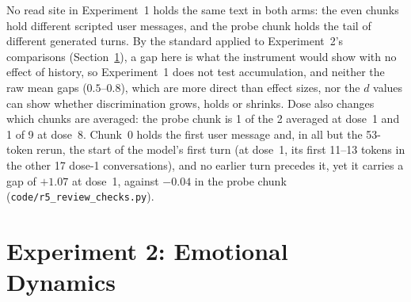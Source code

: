 \documentclass[11pt,a4paper]{article}
\begin{document}
No read site in Experiment~1 holds the same text in both arms: the even
chunks hold different scripted user messages, and the probe chunk holds
the tail of different generated turns. By the standard applied to
Experiment~2's comparisons (Section~\ref{sec:dynamics}), a gap here is
what the instrument would show with no effect of history, so
Experiment~1 does not test accumulation, and neither the raw mean gaps
($0.5$--$0.8$), which are more direct than effect sizes, nor the $d$
values can show whether discrimination grows, holds or shrinks. Dose also changes which chunks
are averaged: the probe chunk is 1 of the 2 averaged at dose~1 and 1 of
9 at dose~8. Chunk~0 holds the first user message and, in all but the 53-token rerun, the start of the model's first turn (at dose~1, its first 11--13 tokens in the other 17 dose-1 conversations), and no earlier turn precedes it, yet it carries a gap of $+1.07$ at
dose~1, against $-0.04$ in the probe chunk
(\texttt{code/r5\_review\_checks.py}).

\section{Experiment 2: Emotional Dynamics}
\label{sec:dynamics}
\end{document}

